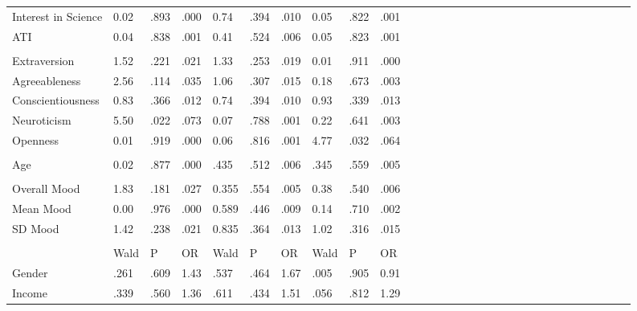 \documentclass[authordate, empirical]{jote-new-article}
\begin{document}
\begin{table}
\begin{tabularx}{\linewidth}{@{} l l l l l l l l l l l l l l l l l l l l l l l l l l l l l l @{}}
			 Interest in Science & 0.02 & .893 & .000 & 0.74 & .394 & .010 & 0.05 & .822
			& .001 \\

			 ATI & 0.04 & .838 & .001 & 0.41 & .524 & .006 & 0.05 & .823 & .001 \\

			  &  &  &  &  &  &  &  &  &  \\

			 Extraversion & 1.52 & .221 & .021 & 1.33 & .253 & .019 & 0.01 & .911 & .000
			\\

			 Agreeableness & 2.56 & .114 & .035 & 1.06 & .307 & .015 & 0.18 & .673 & .003
			\\

			 Conscientiousness & 0.83 & .366 & .012 & 0.74 & .394 & .010 & 0.93 & .339
			& .013 \\

			 Neuroticism & 5.50 & .022 & .073 & 0.07 & .788 & .001 & 0.22 & .641 & .003
			\\

			 Openness & 0.01 & .919 & .000 & 0.06 & .816 & .001 & 4.77 & .032 & .064 \\

			  &  &  &  &  &  &  &  &  &  \\

			 Age & 0.02 & .877 & .000 & .435 & .512 & .006 & .345 & .559 & .005 \\

			  &  &  &  &  &  &  &  &  &  \\

			 Overall Mood & 1.83 & .181 & .027 & 0.355 & .554 & .005 & 0.38 & .540 &
			.006 \\

			 Mean Mood & 0.00 & .976 & .000 & 0.589 & .446 & .009 & 0.14 & .710 & .002
			\\

			 SD Mood & 1.42 & .238 & .021 & 0.835 & .364 & .013 & 1.02 & .316 & .015
			\\

			  &  &  &  &  &  &  &  &  &  \\

			\hline  & Wald & P & OR & Wald & P & OR & Wald & P & OR \\

			\hline Gender & .261 & .609 & 1.43 & .537 & .464 & 1.67 & .005 & .905 & 0.91
			\\

			 Income & .339 & .560 & 1.36 & .611 & .434 & 1.51 & .056 & .812 & 1.29 \\


		\end{tabularx}
	\end{table}
\end{document}
